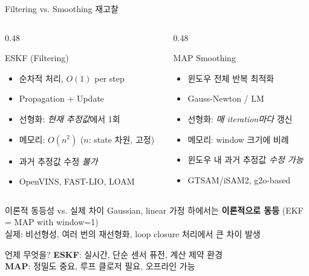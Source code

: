 \begin{frame}{Filtering vs. Smoothing 재고찰}
  \begin{columns}[T]
    \begin{column}{0.48\textwidth}
      \begin{block}{ESKF (Filtering)}
        \begin{itemize}
          \item 순차적 처리, $O(1)$ per step
          \item Propagation + Update
          \item 선형화: \emph{현재 추정값}에서 1회
          \item 메모리: $O(n^2)$ ($n$: state 차원, 고정)
          \item 과거 추정값 수정 \emph{불가}
          \item OpenVINS, FAST-LIO, LOAM
        \end{itemize}
      \end{block}
    \end{column}
    \begin{column}{0.48\textwidth}
      \begin{block}{MAP Smoothing}
        \begin{itemize}
          \item 윈도우 전체 반복 최적화
          \item Gauss-Newton / LM
          \item 선형화: \emph{매 iteration마다} 갱신
          \item 메모리: window 크기에 비례
          \item 윈도우 내 과거 추정값 \emph{수정 가능}
          \item GTSAM/iSAM2, g2o-based
        \end{itemize}
      \end{block}
    \end{column}
  \end{columns}
  \pause
  \vspace{0.5em}
  \begin{alertblock}{이론적 동등성 vs. 실제 차이}
    Gaussian, linear 가정 하에서는 \textbf{이론적으로 동등} (EKF = MAP with window=1)\\
    실제: 비선형성, 여러 번의 재선형화, loop closure 처리에서 큰 차이 발생
  \end{alertblock}
  \pause
  \begin{exampleblock}{언제 무엇을?}
    \textbf{ESKF}: 실시간, 단순 센서 퓨전, 계산 제약 환경\\
    \textbf{MAP}: 정밀도 중요, 루프 클로저 필요, 오프라인 가능
  \end{exampleblock}
\end{frame}

